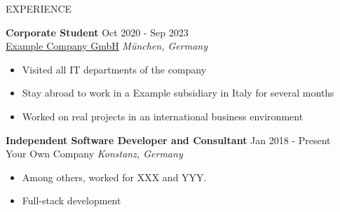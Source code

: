 \documentclass{resume}
\begin{document}
    \begin{rSection}{EXPERIENCE}
    
        \textbf{Corporate Student} \hfill Oct 2020 - Sep 2023\\
        \href{https://www.example.com/}{Example Company GmbH} \hfill \textit{München, Germany}
        \begin{itemize}
        \itemsep -3pt {} 
        \item Visited all IT departments of the company
\item Stay abroad to work in a Example subsidiary in Italy for several months
\item Worked on real projects in an international business environment
        \end{itemize}
        
        \textbf{Independent Software Developer and Consultant} \hfill Jan 2018 - Present\\
        Your Own Company \hfill \textit{Konstanz, Germany}
        \begin{itemize}
        \itemsep -3pt {} 
        \item Among others, worked for XXX and YYY.
\item Full-stack development
        \end{itemize}
        
    \end{rSection}
\end{document}
